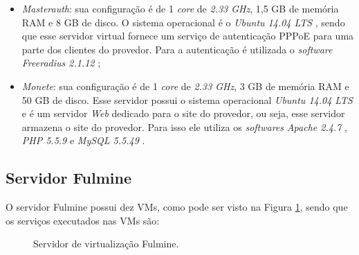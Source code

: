 \begin{itemize}
 \item \textit{Masterauth}: sua configuração é de 1 \textit{core} de \textit{2.33 GHz}, 1,5 GB de memória \ac{RAM} e 8 GB de disco. 
 O sistema operacional é o \textit{Ubuntu 14.04 \ac{LTS}} \cite{ubuntu}, sendo que esse servidor virtual fornece um serviço de autenticação 
 \ac{PPPoE} \cite{javvin2005} para uma parte dos clientes do provedor. Para a autenticação é utilizada o \textit{software} 
 \textit{Freeradius 2.1.12} \cite{freeradius};
 
 \item \textit{Monete}: sua configuração é de 1 \textit{core} de \textit{2.33 GHz}, 3 GB de memória \ac{RAM} e 50 GB de disco. 
 Esse servidor possui o sistema operacional \textit{Ubuntu 14.04 \ac{LTS}} \cite{ubuntu} e é um servidor \textit{Web} dedicado para o site do 
 provedor, ou seja, esse servidor armazena o site do provedor. Para isso ele utiliza os \textit{softwares} 
 \textit{Apache 2.4.7} \cite{apache}, \textit{\ac{PHP} 5.5.9} \cite{php} e \textit{MySQL 5.5.49} \cite{mysql}.
\end{itemize}

\subsection{Servidor Fulmine}
\label{section:serv_fulmine}

O servidor Fulmine possui dez \ac{VM}s, como pode ser visto na Figura \ref{fig:servidor_fulmine}, sendo que os serviços executados nas \ac{VM}s são:

\begin{figure}[h!]
 \centering
 \caption{Servidor de virtualização Fulmine.}
 \label{fig:servidor_fulmine}
\end{figure}

